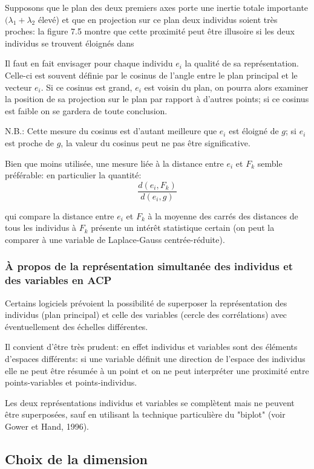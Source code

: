 \documentclass[12pt,a4paper]{article}
\begin{document}
Supposons que le plan des deux premiers axes porte une inertie totale importante
$(\lambda_1 + \lambda_2$ élevé) et que en projection sur ce plan deux individus soient très proches:
la figure 7.5 montre que cette proximité peut être illusoire si les deux individus se trouvent éloignés dans

Il faut en fait envisager pour chaque individu $e_i$ la qualité de sa représentation. Celle-ci
est souvent définie par le cosinus de l'angle entre le plan principal et le vecteur $e_i$. Si ce
cosinus est grand, $e_i$ est voisin du plan, on pourra alors examiner la position de sa projection sur le plan par rapport à d'autres points; si ce cosinus est faible on se gardera de toute
conclusion.

N.B.: Cette mesure du cosinus est d'autant meilleure que $e_i$ est éloigné de $g$; si $e_i$ est
proche de $g$, la valeur du cosinus peut ne pas être significative.

Bien que moins utilisée, une mesure liée à la distance entre $e_i$ et $F_k$ semble préférable: en
particulier la quantité:
\[\frac{d(e_i, F_k)}{d(e_i, g)}\]

qui compare la distance entre $e_i$ et $F_k$ à la moyenne des carrés des distances de tous les individus à $F_k$ présente un intérêt statistique certain (on peut la comparer à une variable de
Laplace-Gauss centrée-réduite).

\subsubsection{À propos de la représentation simultanée des individus et des variables en ACP}

Certains logiciels prévoient la possibilité de superposer la représentation des individus (plan
principal) et celle des variables (cercle des corrélations) avec éventuellement des échelles
différentes.

Il convient d'être très prudent: en effet individus et variables sont des éléments d'espaces différents: si une variable définit une direction de l'espace des individus elle ne peut
être résumée à un point et on ne peut interpréter une proximité entre points-variables
et points-individus.

Les deux représentations individus et variables se complètent mais ne peuvent être superposées, sauf en utilisant la technique particulière du "biplot" (voir Gower et Hand, 1996).

\subsection{Choix de la dimension}
\end{document}
